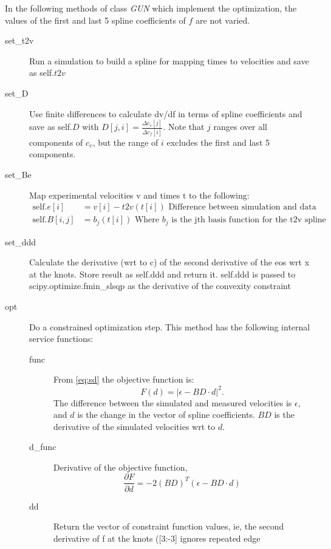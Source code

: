 \documentclass[11pt]{article}
\newcommand{\partiald}[2]{\frac{\partial #1}{\partial #2}}
\begin{document}
In the following methods of class \emph{GUN} which implement the
optimization, the values of the first and last 5 spline coefficients
of $f$ are not varied.
\begin{description}
\item[set\_t2v] Run a simulation to build a spline for mapping times to
  velocities and save as self.$t2v$
\item[set\_D] Use finite differences to calculate dv/df in terms of
  spline coefficients and save as self.$D$ with $D[j,i] = \frac{\Delta
    c_v[j]}{\Delta c_f[i]}$.  Note that $j$ ranges over all components
  of $c_v$, but the range of $i$ excludes the first and last 5 components.
\item[set\_Be] Map experimental velocities v and times t to the
  following:
  \begin{align*}        
    \text{self.}e[i] &= v[i] - t2v(t[i]) \text{ Difference between simulation
                and data} \\
    \text{self.}B[i,j] &= b_j(t[i]) \text{ Where }b_j\text{ is the jth basis function
                  for the t2v spline}    
  \end{align*}
\item[set\_ddd] Calculate the derivative (wrt to c) of the second
  derivative of the eos wrt x at the knots.  Store result as self.ddd
  and return it.  self.ddd is passed to scipy.optimize.fmin\_slsqp as
  the derivative of the convexity constraint
\item[opt] Do a constrained optimization step.  This method has the
  following internal service functions:
  \begin{description}
  \item[func] From \eqref{eq:sd} the objective function is:
    \begin{equation*}
      F(d) = \left| \epsilon - BD\cdot d \right|^2.
    \end{equation*}
    The difference between the simulated and measured velocities is
    $\epsilon$, and $d$ is the change in the vector of spline
    coefficients.  $BD$ is the derivative of the simulated velocities
    wrt to $d$.
  \item[d\_func] Derivative of the objective function,
    \begin{equation*}
    \partiald{F}{d} = -2(BD)^T(\epsilon - BD\cdot d)
    \end{equation*}
  \item[dd] Return the vector of constraint function values, ie, the
    second derivative of f at the knots ([3:-3] ignores repeated edge

\end{description}
\end{description}
\end{document}
